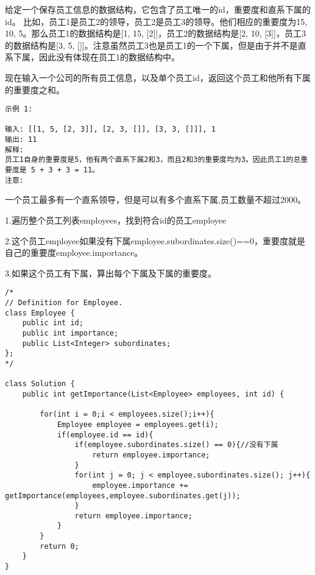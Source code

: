 \documentclass[a4paper]{report}
\begin{document}
给定一个保存员工信息的数据结构，它包含了员工唯一的id，重要度和直系下属的id。
比如，员工1是员工2的领导，员工2是员工3的领导。他们相应的重要度为15, 10, 5。那么员工1的数据结构是[1, 15, [2]]，员工2的数据结构是[2, 10, [3]]，员工3的数据结构是[3, 5, []]。注意虽然员工3也是员工1的一个下属，但是由于并不是直系下属，因此没有体现在员工1的数据结构中。

现在输入一个公司的所有员工信息，以及单个员工id，返回这个员工和他所有下属的重要度之和。

\begin{lstlisting}
示例 1:

输入: [[1, 5, [2, 3]], [2, 3, []], [3, 3, []]], 1
输出: 11
解释:
员工1自身的重要度是5，他有两个直系下属2和3，而且2和3的重要度均为3。因此员工1的总重要度是 5 + 3 + 3 = 11。
注意:
\end{lstlisting}
一个员工最多有一个直系领导，但是可以有多个直系下属,员工数量不超过2000。

\begin{tips}
1.遍历整个员工列表employees，找到符合id的员工employee

2.这个员工employee如果没有下属employee.subordinates.size()==0，重要度就是自己的重要度employee.importance。

3.如果这个员工有下属，算出每个下属及下属的重要度。
\end{tips}

\begin{lstlisting}
/*
// Definition for Employee.
class Employee {
    public int id;
    public int importance;
    public List<Integer> subordinates;
};
*/

class Solution {
    public int getImportance(List<Employee> employees, int id) {

        for(int i = 0;i < employees.size();i++){
            Employee employee = employees.get(i);
            if(employee.id == id){
                if(employee.subordinates.size() == 0){//没有下属
                    return employee.importance;
                }
                for(int j = 0; j < employee.subordinates.size(); j++){
                    employee.importance += getImportance(employees,employee.subordinates.get(j));
                }
                return employee.importance;
            }
        }
        return 0;
    }
}
\end{lstlisting}
\end{document}
